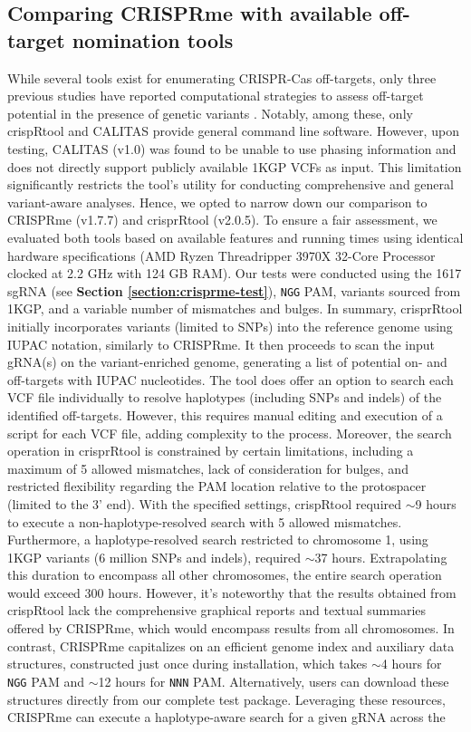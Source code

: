 \documentclass[a4paper, titlepage, openright]{book}
\newcommand{\crisprme}{CRISPRme\xspace}
\begin{document}
\subsection{Comparing \crisprme with available off-target nomination tools}
While several tools exist for enumerating CRISPR-Cas off-targets, only three previous studies have reported computational strategies to assess off-target potential in the presence of genetic variants \citep{lessard2017human,scott2017implications,fennell2021calitas}. Notably, among these, only crispRtool \citep{lessard2017human} and CALITAS \citep{fennell2021calitas} provide general command line software. However, upon testing, CALITAS (v1.0) was found to be unable to use phasing information and does not directly support publicly available 1KGP VCFs as input. This limitation significantly restricts the tool's utility for conducting comprehensive and general variant-aware analyses. Hence, we opted to narrow down our comparison to CRISPRme (v1.7.7) and crisprRtool (v2.0.5). To ensure a fair assessment, we evaluated both tools based on available features and running times using identical hardware specifications (AMD Ryzen Threadripper 3970X 32-Core Processor clocked at 2.2 GHz with 124 GB RAM). Our tests were conducted using the 1617 sgRNA (see \textbf{Section \ref{section:crisprme-test}}), \texttt{NGG} PAM, variants sourced from 1KGP, and a variable number of mismatches and bulges. In summary, crisprRtool initially incorporates variants (limited to SNPs) into the reference genome using IUPAC notation, similarly to \crisprme. It then proceeds to scan the input gRNA(s) on the variant-enriched genome, generating a list of potential on- and off-targets with IUPAC nucleotides. The tool does offer an option to search each VCF file individually to resolve haplotypes (including SNPs and indels) of the identified off-targets. However, this requires manual editing and execution of a script for each VCF file, adding complexity to the process. Moreover, the search operation in crisprRtool is constrained by certain limitations, including a maximum of 5 allowed mismatches, lack of consideration for bulges, and restricted flexibility regarding the PAM location relative to the protospacer (limited to the 3' end). With the specified settings, crispRtool required $\sim$9 hours to execute a non-haplotype-resolved search with 5 allowed mismatches. Furthermore, a haplotype-resolved search restricted to chromosome 1, using 1KGP variants (6 million SNPs and indels), required $\sim$37 hours. Extrapolating this duration to encompass all other chromosomes, the entire search operation would exceed 300 hours. However, it's noteworthy that the results obtained from crispRtool lack the comprehensive graphical reports and textual summaries offered by \crisprme, which would encompass results from all chromosomes. In contrast, \crisprme capitalizes on an efficient genome index and auxiliary data structures, constructed just once during installation, which takes $\sim$4 hours for \texttt{NGG} PAM and $\sim$12 hours for \texttt{NNN} PAM. Alternatively, users can download these structures directly from our complete test package. Leveraging these resources, \crisprme can execute a haplotype-aware search for a given gRNA across the 
\end{document}
